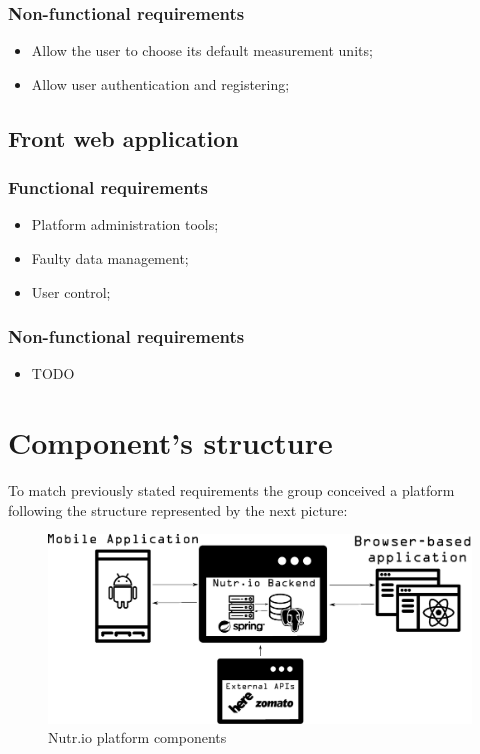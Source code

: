 \subsubsection{Non-functional requirements}

\begin{itemize}
    \item Allow the user to choose its default measurement units;
    \item Allow user authentication and registering;
\end{itemize}

\subsection{Front web application}

\subsubsection{Functional requirements}

\begin{itemize}
    \item Platform administration tools;
    \item Faulty data management;
    \item User control;
\end{itemize}

\subsubsection{Non-functional requirements}

\begin{itemize}
    \item TODO
\end{itemize}

\section{Component's structure}

To match previously stated requirements the group conceived a platform following the structure
represented by the next picture:\\

\begin{figure}[H]
    \begin{center}
        \includegraphics[scale=0.4]{_figures/Nutrio_components.eps}
        \caption{Nutr.io platform components}
    \end{center}
\end{figure}

